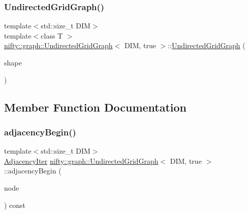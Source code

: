 \subsubsection{\texorpdfstring{Undirected\+Grid\+Graph()}{UndirectedGridGraph()}\hspace{0.1cm}{\footnotesize\ttfamily [2/2]}}
{\footnotesize\ttfamily template$<$std\+::size\+\_\+t D\+IM$>$ \\
template$<$class T $>$ \\
\hyperlink{classnifty_1_1graph_1_1UndirectedGridGraph}{nifty\+::graph\+::\+Undirected\+Grid\+Graph}$<$ D\+IM, true $>$\+::\hyperlink{classnifty_1_1graph_1_1UndirectedGridGraph}{Undirected\+Grid\+Graph} (\begin{DoxyParamCaption}\item[{const \hyperlink{namespacenifty_1_1array_a683f151f19c851754e0c6d55ed16a0c2}{nifty\+::array\+::\+Static\+Array}$<$ T, D\+IM $>$ \&}]{shape }\end{DoxyParamCaption})\hspace{0.3cm}{\ttfamily [inline]}}



\subsection{Member Function Documentation}
\mbox{\label{classnifty_1_1graph_1_1UndirectedGridGraph_3_01DIM_00_01true_01_4_afa50731ffdc02fa8d25caf4edafc1474}} 
\subsubsection{\texorpdfstring{adjacency\+Begin()}{adjacencyBegin()}}
{\footnotesize\ttfamily template$<$std\+::size\+\_\+t D\+IM$>$ \\
\hyperlink{classnifty_1_1graph_1_1UndirectedGridGraph_3_01DIM_00_01true_01_4_a9779969eb8762908d43eab3d9d3b17b1}{Adjacency\+Iter} \hyperlink{classnifty_1_1graph_1_1UndirectedGridGraph}{nifty\+::graph\+::\+Undirected\+Grid\+Graph}$<$ D\+IM, true $>$\+::adjacency\+Begin (\begin{DoxyParamCaption}\item[{const int64\+\_\+t}]{node }\end{DoxyParamCaption}) const\hspace{0.3cm}{\ttfamily [inline]}}

